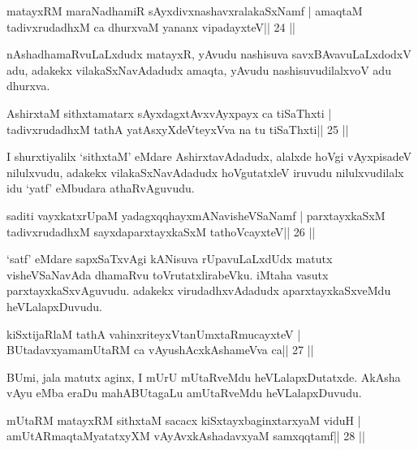 

\begin{shl}
matayxRM maraNadhamiR sAyxdivxnashavxralakaSxNamf |
amaqtaM tadivxrudadhxM ca dhurxvaM yananx vipadayxteV\hfill || 24 ||
\end{shl}

\begin{artha}
nAshadhamaRvuLaLxdudx matayxR, yAvudu nashisuva savxBAvavuLaLxdodxV
adu, adakekx vilakaSxNavAdadudx amaqta, yAvudu nashisuvudilalxvoV adu dhurxva.
\end{artha}

\begin{shl}
AshirxtaM sithxtamatarx sAyxdagxtAvx\s vAyxpayx ca tiSaThxti |
tadivxrudadhxM tathA yatAsxyXdeVteyxVva na tu tiSaThxti\hfill || 25 ||
\end{shl}

\begin{artha}
I shurxtiyalilx `sithxtaM' eMdare AshirxtavAdadudx, alalxde hoVgi
vAyxpisadeV nilulxvudu, adakekx vilakaSxNavAdadudx hoVgutatxleV
iruvudu nilulxvudilalx idu `yatf' eMbudara athaRvAguvudu.
\end{artha}

\begin{shl}
saditi vayxkatxrUpaM yadagxqqhayxmANavisheVSaNamf |
parxtayxkaSxM tadivxrudadhxM sayxdaparxtayxkaSxM tathoVcayxteV\hfill || 26 ||
\end{shl}

\begin{artha}
`satf' eMdare sapxSaTxvAgi kANisuva rUpavuLaLxdUdx matutx visheVSaNavAda dhamaRvu toVrutatxlirabeVku. iMtaha vasutx parxtayxkaSxvAguvudu. adakekx virudadhxvAdadudx aparxtayxkaSxveMdu heVLalapxDuvudu.
\end{artha}

\begin{shl}
kiSxtijaRlaM tathA vahinxriteyxVtanUmxtaRmucayxteV |
BUtadavxyamamUtaRM ca vAyushAcx\s\s kAshameVva ca\hfill || 27 ||
\end{shl}

\begin{artha}
BUmi, jala matutx aginx, I mUrU mUtaRveMdu heVLalapxDutatxde. AkAsha vAyu eMba eraDu mahABUtagaLu amUtaRveMdu heVLalapxDuvudu.
\end{artha}

\begin{shl}
mUtaRM matayxRM sithxtaM sacacx kiSxtayxbaginxtarxyaM viduH |
amUtARmaqtaMyatatxyXM vAyAvxkAshadavxyaM samxqqtamf\hfill || 28 ||
\end{shl}

